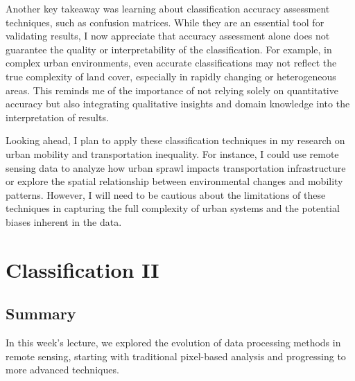 \documentclass[
  letterpaper,
  DIV=11,
  numbers=noendperiod]{scrreprt}
\begin{document}
Another key takeaway was learning about classification accuracy
assessment techniques, such as confusion matrices. While they are an
essential tool for validating results, I now appreciate that accuracy
assessment alone does not guarantee the quality or interpretability of
the classification. For example, in complex urban environments, even
accurate classifications may not reflect the true complexity of land
cover, especially in rapidly changing or heterogeneous areas. This
reminds me of the importance of not relying solely on quantitative
accuracy but also integrating qualitative insights and domain knowledge
into the interpretation of results.

Looking ahead, I plan to apply these classification techniques in my
research on urban mobility and transportation inequality. For instance,
I could use remote sensing data to analyze how urban sprawl impacts
transportation infrastructure or explore the spatial relationship
between environmental changes and mobility patterns. However, I will
need to be cautious about the limitations of these techniques in
capturing the full complexity of urban systems and the potential biases
inherent in the data.


\chapter{Classification II}\label{classification-ii-1}

\section{Summary}\label{summary-5}

In this week's lecture, we explored the evolution of data processing
methods in remote sensing, starting with traditional pixel-based
analysis and progressing to more advanced techniques.
\end{document}
